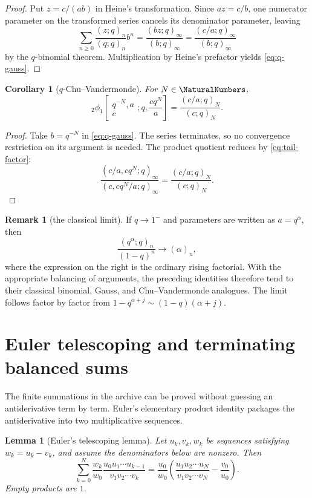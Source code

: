 \documentclass[11pt,oneside]{article}
\newtheorem{lemma}[theorem]{Lemma}
\newtheorem{corollary}[theorem]{Corollary}
\theoremstyle{definition}
\newtheorem{remark}[theorem]{Remark}
\begin{document}
\begin{proof}
Put $z=c/(ab)$ in Heine's transformation. Since $az=c/b$, one numerator parameter on the transformed series cancels its denominator parameter, leaving
\[
 \sum_{n\ge0}\frac{(z;q)_n}{(q;q)_n}b^n
 =\frac{(bz;q)_\infty}{(b;q)_\infty}
 =\frac{(c/a;q)_\infty}{(b;q)_\infty}
\]
by the $q$-binomial theorem. Multiplication by Heine's prefactor yields \eqref{eq:q-gauss}.
\end{proof}

\begin{corollary}[$q$-Chu--Vandermonde]\label{cor:q-chu}
For $N\in\NaturalNumbers$,
\begin{equation}\label{eq:q-chu}
 {}_2\phi_1\!\left[\begin{matrix}q^{-N},a\\c\end{matrix};q,
 \frac{cq^N}{a}\right]
 =\frac{(c/a;q)_N}{(c;q)_N}.
\end{equation}
\end{corollary}

\begin{proof}
Take $b=q^{-N}$ in \eqref{eq:q-gauss}. The series terminates, so no convergence restriction on its argument is needed. The product quotient reduces by \eqref{eq:tail-factor}:
\[
 \frac{(c/a,cq^N;q)_\infty}{(c,cq^N/a;q)_\infty}
 =\frac{(c/a;q)_N}{(c;q)_N}.
\]
\end{proof}

\begin{remark}[the classical limit]
If $q\to1^-$ and parameters are written as $a=q^\alpha$, then
\[
 \frac{(q^\alpha;q)_n}{(1-q)^n}\longrightarrow(\alpha)_n,
\]
where the expression on the right is the ordinary rising factorial. With the appropriate balancing of arguments, the preceding identities therefore tend to their classical binomial, Gauss, and Chu--Vandermonde analogues. The limit follows factor by factor from
$1-q^{\alpha+j}\sim(1-q)(\alpha+j)$.
\end{remark}


\section{Euler telescoping and terminating balanced sums}

The finite summations in the archive can be proved without guessing an antiderivative term by term. Euler's elementary product identity packages the antiderivative into two multiplicative sequences.

\begin{lemma}[Euler's telescoping lemma]\label{lem:euler-telescoping}
Let $u_k,v_k,w_k$ be sequences satisfying $w_k=u_k-v_k$, and assume the denominators below are nonzero. Then
\begin{equation}\label{eq:euler-telescoping}
 \sum_{k=0}^{N}\frac{w_k}{w_0}
 \frac{u_0u_1\cdots u_{k-1}}{v_1v_2\cdots v_k}
 =\frac{u_0}{w_0}
 \left(
 \frac{u_1u_2\cdots u_N}{v_1v_2\cdots v_N}
 -\frac{v_0}{u_0}
 \right).
\end{equation}
Empty products are $1$.
\end{lemma}
\end{document}
